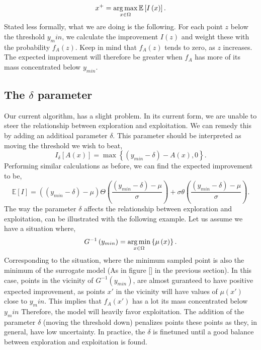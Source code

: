 \documentclass[working, oneside]{../../../Preambles/marginclass}
\begin{document}
\[
x^{+} = \operatorname*{arg\,max}_{x \in \Omega}\mathbb{E}\left[ I\left( x \right)  \right] 
.\] 
Stated less formally, what we are doing is the following. For each point $z$ below the threshold $y_min$, we calculate the improvement $I(z)$ and weight these with the probability $f_A\left( z \right) $. Keep in mind that $f_A(z)$ tends to zero, as  $z$ increases. The expected improvement will therefore be greater when $f_A$ has more of its mass concentrated below $y_{min}$.
\subsection{The $\delta$ parameter}

Our current algorithm, has a slight problem. In its current form, we are unable to steer the relationship between exploration and exploitation. We can remedy this by adding an additioal parameter $\delta$. This parameter should be interpreted as moving the threshold we wish to beat,
\[
    I_{\delta} [A\left( x \right) ] = \max\left\{ \left( y_{min} - \delta \right) - A\left( x \right) , 0  \right\} 
.\] 
Performing similar calculations as before, we can find the expected improvement to be,
\[
\mathbb{E}\left[ I \right] = \left( \left(y_{min} - \delta\right) - \mu  \right) \Theta\left(\frac{\left(y_{min} - \delta\right) - \mu }{\sigma} \right) + \sigma \theta \left( \frac{\left(y_{min} - \delta\right) - \mu }{\sigma} \right) 
.\] 
The way the parameter $\delta$ affects the relationship between exploration and exploitation, can be illustrated with the following example. Let us assume we have a situation where,
\[
    G^{-1}\left(y_{min}\right) = \operatorname*{arg\,min}_{x \in \Omega}\left\{ \mu \left( x \right)  \right\}
.\] 
Corresponding to the situation, where the minimum sampled point is also the minimum of the surrogate model (As in figure [] in the previous section). In this case, points in the vicinity of $G^{-1}\left( y_{min} \right) $, are almost guranteed to have positive expected improvement, as points $x'$ in the vicinity will have values of $\mu \left( x' \right) $ close to $y_min$. This implies that $f_A\left( x' \right) $ has a lot its mass concentrated below $y_min$ Therefore, the model will heavily favor exploitation. The addition of the parameter $\delta$ (moving the threshold down) penalizes points these points as they, in general, have low uncertainty. In practice, the $\delta$ is finetuned until a good balance between exploration and exploitation is found.
\end{document}
